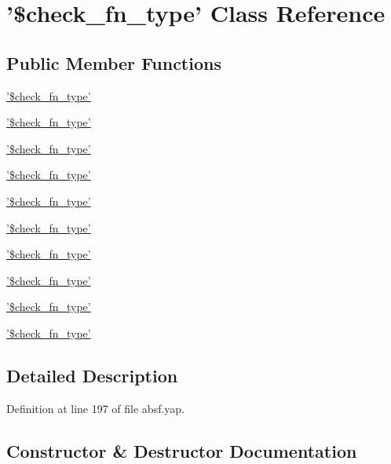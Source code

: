 \section{'\$check\+\_\+fn\+\_\+type' Class Reference}
\label{class'_0Bcheck__fn__type'}
\subsection*{Public Member Functions}
\begin{DoxyCompactItemize}
\item 
\hyperlink{class'_0Bcheck__fn__type'_a4cf18d4456d41f6d7e5a091519b3e482}{'\$check\+\_\+fn\+\_\+type'}
\item 
\hyperlink{class'_0Bcheck__fn__type'_a4cf18d4456d41f6d7e5a091519b3e482}{'\$check\+\_\+fn\+\_\+type'}
\item 
\hyperlink{class'_0Bcheck__fn__type'_a4cf18d4456d41f6d7e5a091519b3e482}{'\$check\+\_\+fn\+\_\+type'}
\item 
\hyperlink{class'_0Bcheck__fn__type'_a4cf18d4456d41f6d7e5a091519b3e482}{'\$check\+\_\+fn\+\_\+type'}
\item 
\hyperlink{class'_0Bcheck__fn__type'_a4cf18d4456d41f6d7e5a091519b3e482}{'\$check\+\_\+fn\+\_\+type'}
\item 
\hyperlink{class'_0Bcheck__fn__type'_a4cf18d4456d41f6d7e5a091519b3e482}{'\$check\+\_\+fn\+\_\+type'}
\item 
\hyperlink{class'_0Bcheck__fn__type'_a4cf18d4456d41f6d7e5a091519b3e482}{'\$check\+\_\+fn\+\_\+type'}
\item 
\hyperlink{class'_0Bcheck__fn__type'_a4cf18d4456d41f6d7e5a091519b3e482}{'\$check\+\_\+fn\+\_\+type'}
\item 
\hyperlink{class'_0Bcheck__fn__type'_a4cf18d4456d41f6d7e5a091519b3e482}{'\$check\+\_\+fn\+\_\+type'}
\item 
\hyperlink{class'_0Bcheck__fn__type'_a4cf18d4456d41f6d7e5a091519b3e482}{'\$check\+\_\+fn\+\_\+type'}
\end{DoxyCompactItemize}


\subsection{Detailed Description}


Definition at line 197 of file absf.\+yap.



\subsection{Constructor \& Destructor Documentation}
